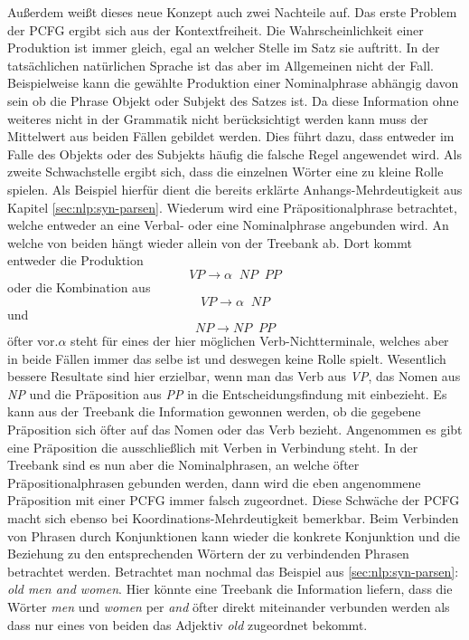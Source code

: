 Außerdem weißt dieses neue Konzept auch zwei Nachteile auf.
Das erste Problem der PCFG ergibt sich aus der Kontextfreiheit. Die Wahrscheinlichkeit einer Produktion ist immer gleich, egal an welcher Stelle im Satz sie auftritt. In der tatsächlichen natürlichen Sprache ist das aber im Allgemeinen nicht der Fall. Beispielweise kann die gewählte Produktion einer Nominalphrase abhängig davon sein ob die Phrase Objekt oder Subjekt des Satzes ist. Da diese Information ohne weiteres nicht in der Grammatik nicht berücksichtigt werden kann muss der Mittelwert aus beiden Fällen gebildet werden. Dies führt dazu, dass entweder im Falle des Objekts oder des Subjekts häufig die falsche Regel angewendet wird. 
Als zweite Schwachstelle ergibt sich, dass die einzelnen Wörter eine zu kleine Rolle spielen. Als Beispiel hierfür dient die bereits erklärte Anhangs-Mehrdeutigkeit aus Kapitel \ref{sec:nlp:syn-parsen}. Wiederum wird eine Präpositionalphrase betrachtet, welche entweder an eine Verbal- oder eine Nominalphrase angebunden wird. An welche von beiden hängt wieder allein von der Treebank ab. Dort kommt entweder die Produktion \[ VP  \to  \alpha \;\;  NP \;\; PP \] oder die Kombination aus \[ VP  \to  \alpha \;\; NP \] und \[ NP  \to  NP \;\; PP \] öfter vor.\( \alpha \) steht für eines der hier möglichen Verb-Nichtterminale, welches aber in beide Fällen immer das selbe ist und deswegen keine Rolle spielt. Wesentlich bessere Resultate sind hier erzielbar, wenn man das Verb aus \textit{VP}, das Nomen aus \textit{NP} und die Präposition aus \textit{PP} in die Entscheidungsfindung mit einbezieht. Es kann aus der Treebank die Information gewonnen werden, ob die gegebene Präposition sich öfter auf das Nomen oder das Verb bezieht. Angenommen es gibt eine Präposition die ausschließlich mit Verben in Verbindung steht. In der Treebank sind es nun aber die Nominalphrasen, an welche öfter Präpositionalphrasen gebunden werden, dann wird die eben angenommene Präposition mit einer PCFG immer falsch zugeordnet. Diese Schwäche der PCFG macht sich ebenso bei Koordinations-Mehrdeutigkeit bemerkbar. Beim Verbinden von Phrasen durch Konjunktionen kann wieder die konkrete Konjunktion und die Beziehung zu den entsprechenden Wörtern der zu verbindenden Phrasen betrachtet werden. Betrachtet man nochmal das Beispiel aus \ref{sec:nlp:syn-parsen}: \textit{old men and women}. Hier könnte eine Treebank die Information liefern, dass die Wörter \textit{men} und \textit{women} per \textit{and} öfter direkt miteinander verbunden werden als dass nur eines von beiden das Adjektiv \textit{old} zugeordnet bekommt. \\

